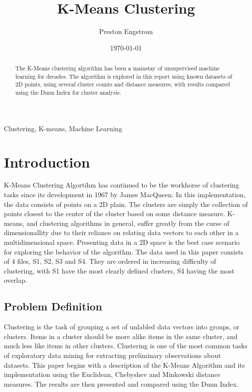 \documentclass[journal]{IEEEtran}
\begin{document}
\title{K-Means Clustering}

\author{Preston Engstrom}
\date{\today}
\maketitle
\lstset{language=Python}

\begin{abstract}
The K-Means clustering algorithm has been a mainstay of unsupervised machine learning for decades. The algorithm is explored in this report using known datasets of 2D points, using several cluster counts and distance measures, with results compared using the Dunn Index for cluster analysis.
\end{abstract}


\begin{IEEEkeywords}
Clustering, K-means, Machine Learning
\end{IEEEkeywords}

\IEEEpeerreviewmaketitle


\section{Introduction}
 K-Means Clustering Algortihm has continued to be the workhorse of clustering tasks since its development in 1967 by James MacQueen.
In this implementation, the data consists of points on a 2D plain. The clusters are simply the collection of points closest to the center of the cluster based on some distance measure. K-means, and clustering algorithms in general, suffer greatly from the curse of dimensionallity due to their reliance on relating data vectors to each other in a multidimensional space. Presenting data in a 2D space is the best case scenario for exploring the behavior of the algorithm.  The data used in this paper consists of 4 files, S1, S2, S3 and S4. They are ordered in increasing difficulty of clustering, with S1 have the most clearly defined clusters, S4 having the most overlap.

\subsection{Problem Definition}
 Clustering is the task of grouping a set of unlabled data vectors into groups, or clusters. Items in a cluster should be more alike items in the same cluster, and much less like items in other clusters. Clustering is one of the most common tasks of exploratory data mining for extracting preliminary observations about datasets. This paper begins with a description of the K-Means Algorithm and its implementation using the Euclidean, Chebyshev and Minkowski distance measures. The results are then presented and compared using the Dunn Index.
\end{document}
